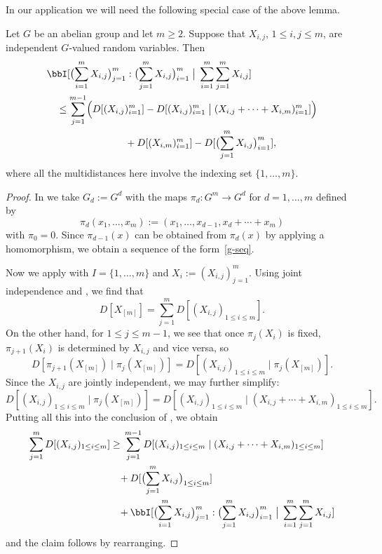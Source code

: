   In our application we will need the following special case of the above lemma.

  \begin{corollary}\label{cor-multid}\leanok Let $G$ be an abelian group and let $m \geq 2$.  Suppose that $X_{i,j}$, $1 \leq i, j \leq m$, are independent $G$-valued random variables.
    Then
    \begin{align*}
      &\bbI[ \bigl(\sum_{i=1}^m X_{i,j}\bigr)_{j =1}^{m} : \bigl(\sum_{j=1}^m X_{i,j}\bigr)_{i = 1}^m \; \big| \; \sum_{i=1}^m \sum_{j = 1}^m  X_{i,j} ] \\
      &\quad \leq \sum_{j=1}^{m-1} \Bigl(D[(X_{i, j})_{i = 1}^m] - D[ (X_{i, j})_{i = 1}^m  \; \big| \; (X_{i,j} + \cdots + X_{i,m})_{i =1}^m ]\Bigr) \\ & \qquad\qquad\qquad\qquad +  D[(X_{i,m})_{i=1}^m] - D[ \bigl(\sum_{j=1}^m X_{i,j}\bigr)_{i=1}^m ],
    \end{align*}
  where all the multidistances here involve the indexing set $\{1,\dots, m\}$.
  \end{corollary}

  \begin{proof}\leanok
    In  we take $G_d := G^d$ with the maps $\pi_d \colon G^m \to G^d$ for $d=1,\dots,m$ defined by
  \[
    \pi_d(x_1,\dots,x_m) := (x_1,\dots,x_{d-1}, x_d + \cdots + x_m)
  \]
  with $\pi_0=0$. Since $\pi_{d-1}(x)$ can be obtained from $\pi_{d}(x)$ by applying a homomorphism, we obtain a sequence of the form~\eqref{g-seq}.

  Now we apply  with $I = \{1,\dots, m\}$ and $X_i :=  (X_{i,j})_{j = 1}^m$.  Using joint independence and , we find that
  \[
    D[ X_{[m]} ] = \sum_{j=1}^m D[ (X_{i,j})_{1 \leq i \leq m} ].
  \]
  On the other hand, for $1 \leq j \leq m-1$, we see that once $\pi_{j}(X_i)$ is fixed, $\pi_{j+1}(X_i)$ is determined by $X_{i, j}$ and vice versa, so
  \[
    D[ \pi_{j+1}(X_{[m]}) \; | \; \pi_{j}(X_{[m]}) ] = D[ (X_{i, j})_{1 \leq i \leq m} \; | \; \pi_{j}(X_{[m]} )].
  \]
  Since the $X_{i,j}$ are jointly independent, we may further simplify:
  \[
    D[ (X_{i, j})_{1 \leq i \leq m} \; | \; \pi_{j}(X_{[m]})] = D[ (X_{i,j})_{1 \leq i \leq m} \; | \; ( X_{i, j} + \cdots + X_{i, m})_{1 \leq i \leq m} ].
  \]
  Putting all this into the conclusion of , we obtain
  \[
    \sum_{j=1}^{m} D[ (X_{i,j})_{1 \leq i \leq m} ]
    \geq
    \begin{aligned}[t]
    &\sum_{j=1}^{m-1} D[ (X_{i,j})_{1 \leq i \leq m} \; | \; (X_{i,j} + \cdots + X_{i,m})_{1 \leq i \leq m} ] \\
    &\!\!\!+
    D[ \bigl(\sum_{j=1}^m X_{i,j}\bigr)_{1 \leq i \leq m}] \\
    &\!\!\!+\bbI[  \bigl(\sum_{i=1}^m X_{i,j}\bigr)_{j =1}^{m} : \bigl(\sum_{j=1}^m X_{i,j}\bigr)_{i = 1}^m \; \big| \; \sum_{i=1}^m \sum_{j = 1}^m  X_{i,j} ]
    \end{aligned}
  \]
  and the claim follows by rearranging.
\end{proof}

